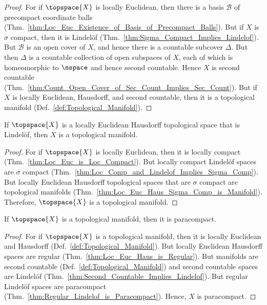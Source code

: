 \documentclass{article}                                                        %
\begin{document}
            \begin{proof}
                For if $\topspace{X}$ is locally Euclidean, then there is a basis
                $\mathcal{B}$ of precompact coordinate balls
                (Thm.~\ref{thm:Loc_Euc_Existence_of_Basis_of_Precompact_Balls}).
                But if $X$ is $\sigma$ compact, then it is Lindel\"{o}f
                (Thm.~\ref{thm:Sigma_Compact_Implies_Lindelof}). But $\mathcal{B}$
                is an open cover of $X$, and hence there is a countable subcover
                $\Delta$. But then $\Delta$ is a countable collection of open
                subspaces of $X$, each of which is homeomorphic to
                $\nspace$ and hence second countable. Hence $X$ is second countable
                (Thm.~\ref{thm:Count_Open_Cover_of_Sec_Count_Implies_Sec_Count}).
                But if $X$ is locally Euclidean, Hausdorff, and second countable,
                then it is a topological manifold
                (Def.~\ref{def:Topological_Manifold}).
            \end{proof}
            \begin{theorem}
                \label{thm:Loc_Euc_Hausdorff_Lindelof_is_Manifold}%
                If $\topspace{X}$ is a locally Euclidean Hausdorff topological space
                that is Lindel\"{o}f, then $X$ is a topological manifold.
            \end{theorem}
            \begin{proof}
                For if $\topspace{X}$ is locally Euclidean, then it is locally
                compact (Thm.~\ref{thm:Loc_Euc_is_Loc_Compact}). But locally compact
                Lindel\"{o}f spaces are $\sigma$ compact
                (Thm.~\ref{thm:Loc_Comp_and_Lindelof_Implies_Sigma_Comp}). But
                locally Euclidean Hausdorff topological spaces that are $\sigma$
                compact are topological manifolds
                (Thm.~\ref{thm:Loc_Euc_Haus_Sigma_Comp_is_Manifold}). Therefore,
                $\topspace{X}$ is a topological manifold.
            \end{proof}
            \begin{theorem}
                \label{thm:Top_Man_is_Paracompact}%
                If $\topspace{X}$ is a topological manifold, then it is paracompact.
            \end{theorem}
            \begin{proof}
                For if $\topspace{X}$ is a topological manifold, then it is
                locally Euclidean and Hausdorff
                (Def.~\ref{def:Topological_Manifold}). But locally Euclidean
                Hausdorff spaces are regular
                (Thm.~\ref{thm:Loc_Euc_Haus_is_Regular}). But manifolds are
                second countable (Def.~\ref{def:Topological_Manifold}) and
                second countable spaces are Lindel\"{o}f
                (Thm.~\ref{thm:Second_Countable_Implies_Lindelof}). But
                regular Lindel\"{o}f spaces are paracompact
                (Thm.~\ref{thm:Regular_Lindelof_is_Paracompact}). Hence,
                $X$ is paracompact.
            \end{proof}
\end{document}
